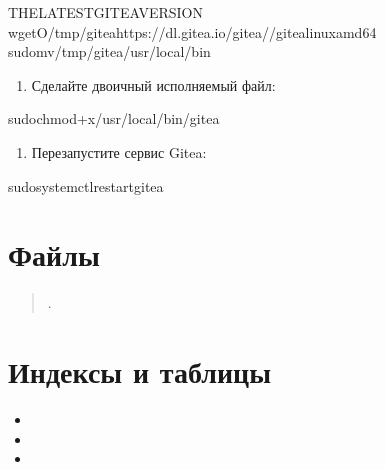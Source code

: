 \documentclass[a4paper,10pt,russian]{report}
\begin{document}
\begin{sphinxVerbatim}[commandchars=\\\{\}]
\PYGZdl{}\PYGZlt{}THE\PYGZus{}LATEST\PYGZus{}GITEA\PYGZus{}VERSION\PYGZgt{}
\PYGZdl{}wget\PYGZhy{}O/tmp/giteahttps://dl.gitea.io/gitea//gitea\PYGZhy{}\PYGZhy{}linux\PYGZhy{}amd64
\PYGZdl{}sudomv/tmp/gitea/usr/local/bin
\end{sphinxVerbatim}
\begin{enumerate}
%
\setcounter{enumi}{2}
\item {} 
\sphinxAtStartPar
Сделайте двоичный исполняемый файл:

\end{enumerate}

\begin{sphinxVerbatim}[commandchars=\\\{\}]
\PYGZdl{}sudochmod+x/usr/local/bin/gitea
\end{sphinxVerbatim}
\begin{enumerate}
%
\setcounter{enumi}{3}
\item {} 
\sphinxAtStartPar
Перезапустите сервис Gitea:

\end{enumerate}

\begin{sphinxVerbatim}[commandchars=\\\{\}]
\PYGZdl{}sudosystemctlrestartgitea
\end{sphinxVerbatim}

\sphinxstepscope


\chapter{Файлы}
\label{\detokenize{files:id1}}\label{\detokenize{files::doc}}\begin{quote}

\sphinxAtStartPar
{}.
\end{quote}


\chapter{Индексы и таблицы}
\label{\detokenize{index:id1}}\begin{itemize}
\item {} 
\sphinxAtStartPar
{}

\item {} 
\sphinxAtStartPar
{}

\item {} 
\sphinxAtStartPar
{}

\end{itemize}
\end{document}
